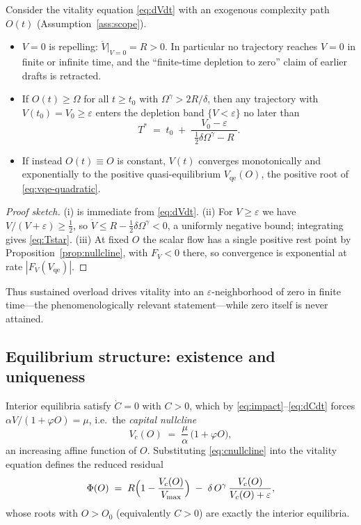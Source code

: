 \begin{proposition}
\label{prop:band}
Consider the vitality equation \eqref{eq:dVdt} with an exogenous complexity
path $O(t)$ (Assumption~\ref{ass:scope}).
\begin{itemize}
\item[(i)] $V=0$ is repelling: $\dot V|_{V=0}=R>0$. In particular no
trajectory reaches $V=0$ in finite or infinite time, and the ``finite-time
depletion to zero'' claim of earlier drafts is retracted.
\item[(ii)] If $O(t)\ge\Omega$ for all $t\ge t_0$ with
$\Omega^{\gamma} > 2R/\delta$, then any trajectory with
$V(t_0)=V_0\ge\varepsilon$ enters the depletion band
$\{V<\varepsilon\}$ no later than
\begin{equation}
\label{eq:Tstar}
T^{*} \;=\; t_0 \;+\;
\frac{V_0-\varepsilon}{\;\tfrac{1}{2}\delta\Omega^{\gamma}-R\;}.
\end{equation}
\item[(iii)] If instead $O(t)\equiv O$ is constant, $V(t)$ converges
monotonically and exponentially to the positive quasi-equilibrium
$V_{\mathrm{qe}}(O)$, the positive root of \eqref{eq:vqe-quadratic}.
\end{itemize}
\end{proposition}

\begin{proof}[Proof sketch]
(i) is immediate from \eqref{eq:dVdt}. (ii) For $V\ge\varepsilon$ we have
$V/(V+\varepsilon)\ge\tfrac12$, so
$\dot V \le R-\tfrac12\delta\Omega^{\gamma}<0$, a uniformly negative bound;
integrating gives \eqref{eq:Tstar}. (iii) At fixed $O$ the scalar flow has a
single positive rest point by Proposition~\ref{prop:nullcline}, with
$F_V<0$ there, so convergence is exponential at rate $|F_V(V_{\mathrm{qe}})|$.
\end{proof}

Thus sustained overload drives vitality into an $\varepsilon$-neighborhood of
zero in finite time---the phenomenologically relevant statement---while zero
itself is never attained.

\subsection{Equilibrium structure: existence and uniqueness}
\label{sec:equilibrium}

Interior equilibria satisfy $\dot C=0$ with $C>0$, which by
\eqref{eq:impact}--\eqref{eq:dCdt} forces $\alpha V/(1+\varphi O)=\mu$, i.e.\
the \emph{capital nullcline}
\begin{equation}
\label{eq:cnullcline}
V_c(O) \;=\; \frac{\mu}{\alpha}\,\bigl(1+\varphi O\bigr),
\end{equation}
an increasing affine function of $O$. Substituting \eqref{eq:cnullcline} into
the vitality equation defines the reduced residual
\begin{equation}
\label{eq:phi-residual}
\Phi(O) \;=\;
R\Bigl(1-\frac{V_c(O)}{V_{\max}}\Bigr)
\;-\;\delta\,O^{\gamma}\,\frac{V_c(O)}{V_c(O)+\varepsilon},
\end{equation}
whose roots with $O>O_0$ (equivalently $C>0$) are exactly the interior
equilibria.

